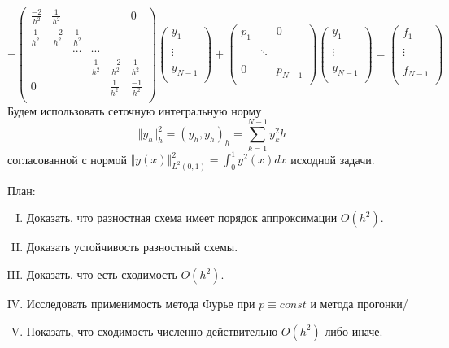 \documentclass[12pt]{article}
\begin{document}
    \[
    -\left(\begin{array}{cccccc}
        \frac{-2}{h^2}& \frac{1}{h^2}  &&&& 0 \\
        \frac{1}{h^2} & \frac{-2}{h^2} & \frac{1}{h^2} &&& \\
        &&\cdots&\cdots&& \\
        &&& \frac{1}{h^2} & \frac{-2}{h^2} & \frac{1}{h^2} \\
        0 &&&               & \frac{1}{h^2}  & \frac{-1}{h^2} \\
    \end{array}\right)
    \left(\begin{array}{c}
        y_{1}\\
        \\
        \vdots\\
        \\
        y_{N-1}\\
    \end{array}\right)
    +
    \left(\begin{array}{ccc}
        p_1  && 0 \\
        && \\
        &\ddots& \\
        && \\
        0 && p_{N-1} \\
    \end{array}\right)
    \left(\begin{array}{c}
        y_{1}\\
        \\
        \vdots\\
        \\
        y_{N-1}\\
    \end{array}\right)
    =
    \left(\begin{array}{c}
        f_{1}\\
        \\
        \vdots\\
        \\
        f_{N-1}\\
    \end{array}\right)
    \]
    Будем использовать сеточную интегральную норму
    \[\Vert y_h\Vert^2_h = (y_h,y_h)_h= \sum_{k=1}^{N-1}y^2_kh\]
    согласованной с нормой $\Vert y(x)\Vert^2_{L^2(0,1)} = \int_0^1y^2(x)dx$ исходной задачи.

    План:
    \begin{enumerate}[I.]
        \item Доказать, что разностная схема имеет порядок аппроксимации $O(h^2)$.
        \item Доказать устойчивость разностный схемы.
        \item Доказать, что есть сходимость $O(h^2)$.
        \item Исследовать применимость метода Фурье при $p \equiv const$ и метода прогонки/
        \item Показать, что сходимость численно действительно $O(h^2)$ либо иначе.
    \end{enumerate}
\end{document}
